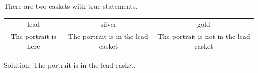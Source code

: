 There are two caskets with true statements.
\begin{tabular}{ccc}
\toprule
lead & silver & gold\\
The portrait is here & The portrait is in the lead casket & The portrait is not in the lead casket\\
\bottomrule
\end{tabular}
Solution: The portrait is in the lead casket.